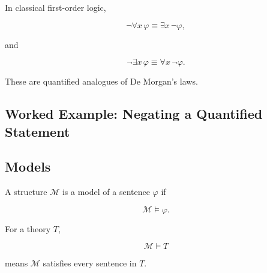 In classical first-order logic,

\[
\boxed{
\neg\forall x\,\varphi
\equiv
\exists x\,\neg\varphi,
}
\]

and

\[
\boxed{
\neg\exists x\,\varphi
\equiv
\forall x\,\neg\varphi.
}
\]

These are quantified analogues of De Morgan's laws.

\subsection{Worked Example: Negating a Quantified Statement}
\label{subsec:worked-negating-quantifier}


\subsection{Models}
\label{subsec:formal-models}

A structure \(\mathcal{M}\) is a model of a sentence \(\varphi\) if

\[
\boxed{
\mathcal{M}\models\varphi.
}
\]

For a theory \(T\),

\[
\boxed{
\mathcal{M}\models T
}
\]

means \(\mathcal{M}\) satisfies every sentence in \(T\).

